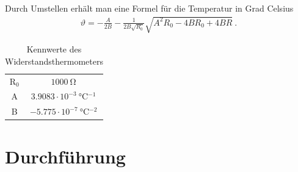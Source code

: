 \documentclass[12pt,a4paper,titlepage,headinclude,bibtotoc]{scrartcl}
\numberwithin{equation}{subsection}
\begin{document}
Durch Umstellen erhält man eine Formel für die Temperatur in Grad Celsius
\begin{align}
 \vartheta = -\frac{A}{2 B} - \frac{1}{2 B \sqrt{R_0}} \sqrt{A^2 R_0  - 4 B R_0 + 4 B R    }\label{eq:temperapt1000}~.
\end{align}

\begin{table}[!htb]
	\centering
	\begin{tabular}{|c|c|}
		\hline
		R$_0$ & $1000 ~ \si{\ohm}$\\
		A   & $3.9083 \cdot 10^{-3} ~ \si{\celsius^{-1}}$\\
		B   & $-5.775 \cdot 10^{-7} ~ \si{\celsius^{-2}}$\\
		\hline
	\end{tabular}
	\caption{Kennwerte des Widerstandsthermometers}
	\label{tab:Pt1000}
\end{table}


\section{Durchführung}
\label{sec:durchfuehrung}
\end{document}
